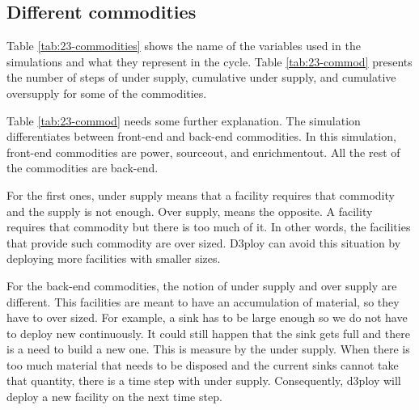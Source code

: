 \documentclass[11pt]{article}
\begin{document}
\subsection{Different commodities}

Table \ref{tab:23-commodities} shows the name of the variables used in the simulations and what they represent in the cycle. Table \ref{tab:23-commod} presents the number of steps of under supply, cumulative under supply, and cumulative oversupply for some of the commodities.

Table \ref{tab:23-commod} needs some further explanation. The simulation differentiates between front-end and back-end commodities. In this simulation, front-end commodities are power, sourceout, and enrichmentout. All the rest of the commodities are back-end. 

For the first ones, under supply means that a facility requires that commodity and the supply is not enough. Over supply, means the opposite. A facility requires that commodity but there is too much of it. In other words, the facilities that provide such commodity are over sized. D3ploy can avoid this situation by deploying more facilities with smaller sizes.

For the back-end commodities, the notion of under supply and over supply are different. This facilities are meant to have an accumulation of material, so they have to over sized. For example, a sink has to be large enough so we do not have to deploy new continuously. It could still happen that the sink gets full and there is a need to build a new one. This is measure by the under supply. When there is too much material that needs to be disposed and the current sinks cannot take that quantity, there is a time step with under supply. Consequently, d3ploy will deploy a new facility on the next time step.
\end{document}
